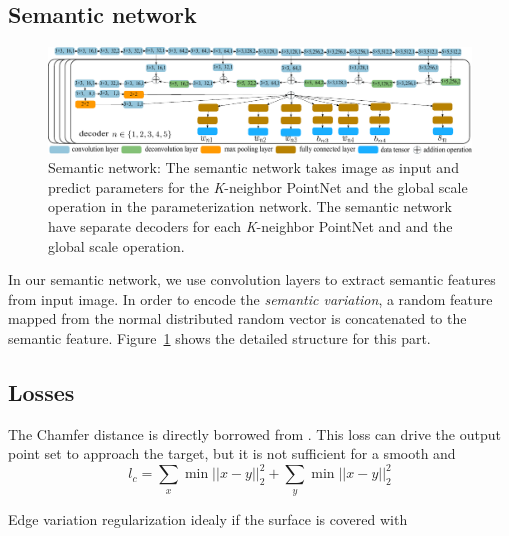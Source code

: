 \subsection{Semantic network}
\label{subsec:semnet}
\begin{figure}[htbp]
	\centering
	\includegraphics[width=\linewidth]{img/net/semnet}
	\caption{Semantic network: The semantic network takes image as input and predict parameters for the \textit{K}-neighbor PointNet and the global scale operation in the parameterization network. The semantic network have separate decoders for each \textit{K}-neighbor PointNet and and the global scale operation.}
	\label{fig:conv}
\end{figure}
In our semantic network, we use convolution layers to extract semantic features from input image. In order to encode the \textit{semantic variation}, a random feature mapped from the normal distributed random vector is concatenated to the semantic feature.  Figure~\ref{fig:conv} shows the detailed structure for this part. 
\subsection{Losses}
 The Chamfer distance is directly borrowed from \citep{PSGN}. This loss can drive the output point set to approach the target, but it is not sufficient for a smooth and  
\begin{equation}
l_c = \sum_x \min||x-y||_2^2+\sum_y \min||x-y||_2^2
\end{equation}

Edge variation regularization 
idealy if the surface is covered with 

